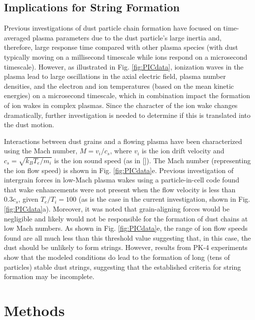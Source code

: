 \documentclass[aip,amsmath,amssymb,graphicx,floatfix,reprint]{revtex4-1}
\begin{document}
\subsection{Implications for String Formation}
\label{string formation}
Previous investigations of dust particle chain formation have focused on time-averaged plasma parameters due to the dust particle’s large inertia and, therefore, large response time compared with other plasma species\cite{Arp2012} (with dust typically moving on a millisecond timescale while ions respond on a microsecond timescale).  However, as illustrated in Fig. \ref{fig:PICdata}, ionization waves in the plasma lead to large oscillations in the axial electric field, plasma number densities, and the electron and ion temperatures (based on the mean kinetic energies) on a microsecond timescale\cite{Hartmann2020}, which in combination impact the formation of ion wakes in complex plasmas.  Since the character of the ion wake changes dramatically, further investigation is needed to determine if this is translated into the dust motion.

Interactions between dust grains and a flowing plasma have been characterized using the Mach number, $M = v_{i}/c_{s}$, where $v_{i}$ is the ion drift velocity and $c_s = \sqrt{k_B T_e/m_i}$ is the ion sound speed (as in []). The Mach number (representing the ion flow speed) is shown in Fig. \ref{fig:PICdata}e.  Previous investigation of intergrain forces in low-Mach plasma wakes using a particle-in-cell code\cite{Hutchinson2012} found that wake enhancements were not present when the flow velocity is less than $0.3 c_s$, given $T_e/T_i = 100$ (as is the case in the current investigation, shown in Fig. \ref{fig:PICdata}a).  Moreover, it was noted that grain-aligning forces would be negligible and likely would not be responsible for the formation of dust chains at low Mach numbers.  As shown in Fig. \ref{fig:PICdata}e, the range of ion flow speeds found are all much less than this threshold value suggesting that, in this case, the dust should be unlikely to form strings.  However, results from PK-4 experiments show that the modeled conditions do lead to the formation of long (tens of particles) stable dust strings, suggesting that the established criteria for string formation may be incomplete.

\section{Methods}
\label{methods}
\end{document}
